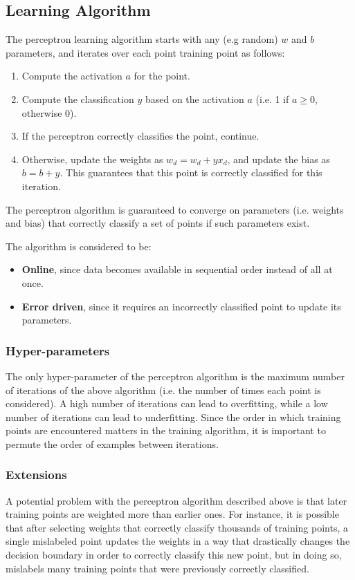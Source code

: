 \documentclass[12pt,titlepage]{article}
\begin{document}
    \subsection{Learning Algorithm}
      The perceptron learning algorithm starts with any (e.g random) $w$ and $b$ parameters, and iterates over each point training point as follows:
      \begin{enumerate}
        \item Compute the activation $a$ for the point.
        \item Compute the classification $y$ based on the activation $a$ (i.e. 1 if $a \geq 0$, otherwise 0).
        \item If the perceptron correctly classifies the point, continue.
        \item Otherwise, update the weights as $w_d = w_d + yx_d$, and update the bias as $b = b + y$. This guarantees that this point is correctly classified for this
          iteration.
      \end{enumerate}

      The perceptron algorithm is guaranteed to converge on parameters (i.e. weights and bias) that correctly classify a set of points if such parameters exist.

      The algorithm is considered to be:
      \begin{itemize}
        \item \textbf{Online}, since data becomes available in sequential order instead of all at once.
        \item \textbf{Error driven}, since it requires an incorrectly classified point to update its parameters.
      \end{itemize}

      \subsubsection{Hyper-parameters}
        The only hyper-parameter of the perceptron algorithm is the maximum number of iterations of the above algorithm (i.e. the number of times each point is considered).
        A high number of iterations can lead to overfitting, while a low number of iterations can lead to underfitting. Since the order in which training points are
        encountered matters in the training algorithm, it is important to permute the order of examples between iterations.

      \subsubsection{Extensions}
        A potential problem with the perceptron algorithm described above is that later training points are weighted more than earlier ones. For instance, it is possible
        that after selecting weights that correctly classify thousands of training points, a single mislabeled point updates the weights in a way that drastically changes
        the decision boundary in order to correctly classify this new point, but in doing so, mislabels many training points that were previously correctly classified.
\end{document}
